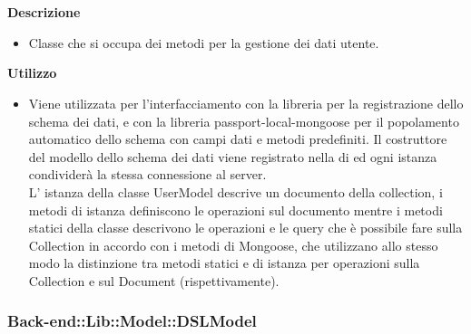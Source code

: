 				\textbf{\\ \\ Descrizione} 
					\begin{itemize}
						\item[] Classe che si occupa dei metodi per la gestione dei dati utente. 
					\end{itemize}      
				\textbf{Utilizzo}  
					\begin{itemize}
						\item[] Viene utilizzata per l'interfacciamento con la libreria  per la registrazione dello schema dei dati, e con la libreria passport-local-mongoose per il popolamento automatico dello schema con campi dati e metodi predefiniti.
Il costruttore del modello dello schema dei dati viene registrato nella  di  ed ogni istanza condividerà la stessa connessione al server. \\
L' istanza della classe UserModel descrive un documento della collection, i metodi di istanza definiscono le operazioni sul documento mentre i metodi statici della classe descrivono le operazioni e le query che è possibile fare sulla Collection in accordo con i metodi di Mongoose, che utilizzano allo stesso modo la distinzione tra metodi statici e di istanza per operazioni sulla Collection e sul Document (rispettivamente).

					\end{itemize}
	\subsubsection{Back-end::Lib::Model::DSLModel}
